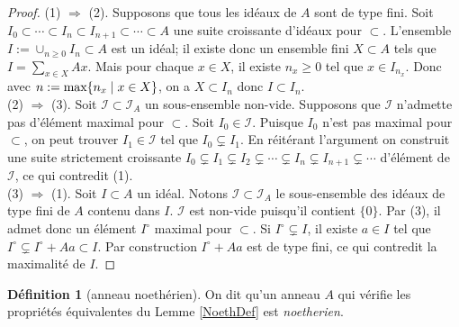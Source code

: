 \documentclass[a4paper, oneside, 12pt]{book}
\theoremstyle{theoremeStyle} %
\theoremstyle{definition} %
\newtheorem{definition}[theoreme]{Définition}
\begin{document}
\begin{proof} (1) $\Rightarrow$ (2). Supposons que tous les idéaux de $A$ sont de type fini. Soit $I_0\subset\cdots\subset I_n\subset I_{n+1}\subset \cdots\subset A$ une suite croissante d'idéaux pour $\subset $. L'ensemble $I:=\cup_{n\geq 0}I_n\subset A$ est un idéal; il existe donc un ensemble fini $X\subset A$ tels que $I=\sum_{x\in X}Ax$. Mais pour chaque $x\in X$, il existe $n_x\geq 0$ tel que $x\in I_{n_x}$. Donc avec $n:=\hbox{\rm max}\lbrace n_x\;|\; x\in X\rbrace$, on a $X\subset I_n$ donc $I\subset I_n$. \\
 (2) $\Rightarrow$ (3). Soit $\mathcal{I}\subset \mathcal{I}_A$ un sous-ensemble non-vide. Supposons que $\mathcal{I}$ n'admette pas d'élément maximal pour $\subset$. Soit $I_0\in \mathcal{I}$. Puisque $I_0$ n'est pas maximal pour $\subset$, on peut  trouver $I_1\in \mathcal{I}$ tel que $I_0\subsetneq I_1$. En réitérant l'argument on construit une suite strictement croissante $I_0\subsetneq I_1\subsetneq I_2\subsetneq\cdots\subsetneq I_n\subsetneq I_{n+1}\subsetneq \cdots$ d'élément de $\mathcal{I}$, ce qui contredit (1).\\
 (3) $\Rightarrow$ (1). Soit $I\subset A$ un idéal. Notons $\mathcal{I}\subset \mathcal{I}_A$ le sous-ensemble des idéaux de type fini de $A$ contenu dans $I$. $\mathcal{I}$ est non-vide puisqu'il contient $\lbrace 0\rbrace$. Par (3), il admet donc un élément $I^\circ$ maximal pour $\subset$. Si $I^\circ\subsetneq I$, il existe $a\in I$ tel que $I^\circ\subsetneq I^\circ+Aa\subset I$. Par construction $I^\circ+Aa$ est de type fini, ce qui contredit la maximalité de $I$.\end{proof}

\begin{definition}[anneau noethérien]
  On dit qu'un anneau $A$ qui vérifie les propriétés équivalentes du Lemme \ref{NoethDef} est \textit{noetherien}.
\end{definition}
\end{document}
